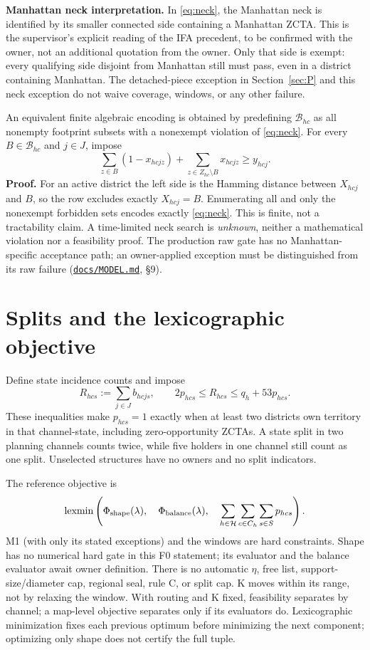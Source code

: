 \documentclass[11pt,letterpaper]{article}
\newcommand{\MODEL}{\href{MODEL.md}{\texttt{docs/MODEL.md}}}
\DeclareMathOperator{\lexmin}{lexmin}
\begin{document}
\textbf{Manhattan neck interpretation.} In \eqref{eq:neck}, the Manhattan
neck is identified by its smaller connected side containing a Manhattan
ZCTA. This is the supervisor's explicit reading of the IFA precedent, to
be confirmed with the owner, not an additional quotation from the owner.
Only that side is exempt: every qualifying side disjoint from Manhattan
still must pass, even in a district containing Manhattan. The detached-piece
exception in Section~\ref{sec:P} and this neck exception do not waive
coverage, windows, or any other failure.

An equivalent finite algebraic encoding is obtained by predefining
$\mathcal B_{hc}$ as all nonempty footprint subsets with a nonexempt
violation of \eqref{eq:neck}. For every $B\in\mathcal B_{hc}$ and $j\in J$,
impose
\begin{equation}\label{eq:nogood}
 \sum_{z\in B}(1-x_{hcjz})+
 \sum_{z\in Z_{hc}\setminus B}x_{hcjz}\ge y_{hcj}.
\end{equation}
\textbf{Proof.} For an active district the left side is the Hamming distance
between $X_{hcj}$ and $B$, so the row excludes exactly $X_{hcj}=B$.
Enumerating all and only the nonexempt forbidden sets encodes exactly
\eqref{eq:neck}. This is finite, not a tractability claim. A time-limited
neck search is \emph{unknown}, neither a mathematical violation nor a
feasibility proof. The production raw gate has no Manhattan-specific
acceptance path; an owner-applied exception must be distinguished from
its raw failure (\MODEL, \S9).

\section{Splits and the lexicographic objective}
Define state incidence counts and impose
\begin{equation}\label{eq:splits}
 R_{hcs}:=\sum_{j\in J}b_{hcjs},\qquad
 2p_{hcs}\le R_{hcs}\le q_h+53p_{hcs}.
\end{equation}
These inequalities make $p_{hcs}=1$ exactly when at least two districts
own territory in that channel-state, including zero-opportunity ZCTAs.
A state split in two planning channels counts twice, while five holders
in one channel still count as one split. Unselected structures have no
owners and no split indicators.

The reference objective is
\begin{equation}\label{eq:objective}
 \lexmin\left(
 \Phi_{\rm shape}(\lambda),\quad
 \Phi_{\rm balance}(\lambda),\quad
 \sum_{h\in\mathcal H}\sum_{c\in C_h}\sum_{s\in S}p_{hcs}
 \right).
\end{equation}
M1 (with only its stated exceptions) and the windows are hard constraints.
Shape has no numerical hard gate in this F0 statement; its evaluator and
the balance evaluator await owner definition. There is no automatic
$\eta$, free list, support-size/diameter cap, regional seal, rule C, or split
cap. K moves within its range, not by relaxing the window. With routing
and K fixed, feasibility separates by channel; a map-level objective
separates only if its evaluators do. Lexicographic minimization fixes each
previous optimum before minimizing the next component; optimizing only
shape does not certify the full tuple.
\end{document}
